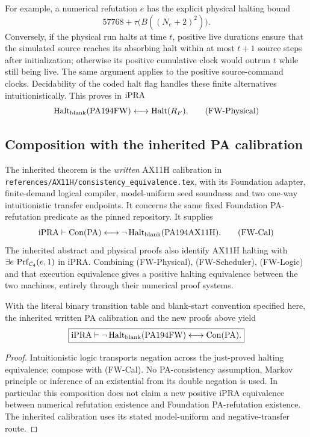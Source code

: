 For example, a numerical refutation $e$ has the explicit physical
halting bound
\[
                 57768+\tau\bigl(B((N_e+2)^2)\bigr).      \tag{FW-Time}
\]
Conversely, if the physical run halts at time $t$, positive live
durations ensure that the simulated source reaches its absorbing halt
within at most $t+1$ source steps after initialization; otherwise its
positive cumulative clock would outrun $t$ while still being live.
The same argument applies to the positive source-command clocks.
Decidability of the coded halt flag handles these finite alternatives
intuitionistically.  This proves in $\mathrm{iPRA}$
\[
 \operatorname{Halt}_{\rm blank}(\mathrm{PA194FW})
 \longleftrightarrow\operatorname{Halt}(R_F).           \tag{FW-Physical}
\]

\subsection{Composition with the inherited PA calibration}

The inherited theorem is the \emph{written} AX11H calibration in
\nolinkurl{references/AX11H/consistency_equivalence.tex}, with its
Foundation adapter, finite-demand logical compiler, model-uniform seed
soundness and two one-way intuitionistic transfer endpoints.  It
concerns the same fixed Foundation PA-refutation predicate as the pinned
repository.  It supplies
\[
 \mathrm{iPRA}\vdash
 \operatorname{Con}(\mathrm{PA})\longleftrightarrow
 \neg\operatorname{Halt}_{\rm blank}(\mathrm{PA194AX11H}).
                                                               \tag{FW-Cal}
\]
The inherited abstract and physical proofs also identify AX11H halting
with $\exists e\,\operatorname{Prf}_{\mathcal C_4}(e,1)$ in iPRA.
Combining (FW-Physical), (FW-Scheduler), (FW-Logic) and that execution
equivalence gives a positive halting equivalence between the two
machines, entirely through their numerical proof systems.

\begin{fwtheorem}[PA194FW preservation]
With the literal binary transition table and blank-start convention
specified here, the inherited written PA calibration and the new
proofs above yield
\[
 \boxed{\mathrm{iPRA}\vdash
    \neg\operatorname{Halt}_{\rm blank}(\mathrm{PA194FW})
        \longleftrightarrow\operatorname{Con}(\mathrm{PA}).}
\]
\end{fwtheorem}
\begin{proof}
Intuitionistic logic transports negation across the just-proved halting
equivalence; compose with (FW-Cal).  No PA-consistency assumption,
Markov principle or inference of an existential from its double
negation is used.  In particular this composition does not claim a
new positive iPRA equivalence between numerical refutation existence
and Foundation PA-refutation existence.  The inherited calibration
uses its stated model-uniform and negative-transfer route.
\end{proof}

